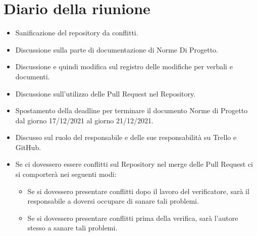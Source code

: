 \section{Diario della riunione}
\begin{itemize}
  \item Sanificazione del repository da conflitti.
  \item Discussione sulla parte di documentazione di Norme Di Progetto.
  \item Discussione e quindi modifica sul registro delle modifiche per verbali e documenti.
  \item Discussione sull'utilizzo delle Pull Request nel Repository.
  \item Spostamento della deadline per terminare il documento Norme di Progetto dal giorno 17/12/2021 al giorno 21/12/2021.
  \item Discusso sul ruolo del responsabile e delle sue responsabilità su Trello e GitHub.
  \item Se ci dovessero essere conflitti sul Repository nel merge delle Pull Request ci si comporterà nei seguenti modi:
  \begin{itemize}
    \item Se si dovessero presentare conflitti dopo il lavoro del verificatore, sarà il responsabile a doversi occupare di sanare tali problemi.
    \item Se si dovessero presentare conflitti prima della verifica, sarà l'autore stesso a sanare tali problemi.
  \end{itemize}
\end{itemize}
